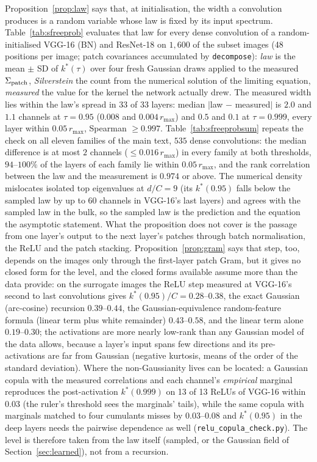\documentclass[10pt,journal,compsoc]{IEEEtran}
\begin{document}
Proposition~\ref{prop:law} says that, at initialisation, the width a convolution produces is a random variable whose law is fixed by its input spectrum. Table~\ref{tab:sfreeprob} evaluates that law for every dense convolution of a random-initialised VGG-16 (BN) and ResNet-18 on $1{,}600$ of the subset images (48 positions per image; patch covariances accumulated by \texttt{decompose}): \emph{law} is the mean $\pm$ SD of $k^*(\tau)$ over four fresh Gaussian draws applied to the measured $\Sigma_{\rm patch}$, \emph{Silverstein} the count from the numerical solution of the limiting equation, \emph{measured} the value for the kernel the network actually drew. The measured width lies within the law's spread in 33 of 33 layers: median $|$law $-$ measured$|$ is $2.0$ and $1.1$ channels at $\tau = 0.95$ ($0.008$ and $0.004\,r_{\max}$) and $0.5$ and $0.1$ at $\tau = 0.999$, every layer within $0.05\,r_{\max}$, Spearman $\ge 0.997$. Table~\ref{tab:sfreeprobsum} repeats the check on all eleven families of the main text, $535$ dense convolutions: the median difference is at most $2$ channels ($\le 0.016\,r_{\max}$) in every family at both thresholds, $94$--$100\%$ of the layers of each family lie within $0.05\,r_{\max}$, and the rank correlation between the law and the measurement is $0.974$ or above. The numerical density mislocates isolated top eigenvalues at $d/C = 9$ (its $k^*(0.95)$ falls below the sampled law by up to $60$ channels in VGG-16's last layers) and agrees with the sampled law in the bulk, so the sampled law is the prediction and the equation the asymptotic statement. What the proposition does not cover is the passage from one layer's output to the next layer's patches through batch normalisation, the ReLU and the patch stacking. Proposition~\ref{prop:gram} says that step, too, depends on the images only through the first-layer patch Gram, but it gives no closed form for the level, and the closed forms available assume more than the data provide: on the surrogate images the ReLU step measured at VGG-16's second to last convolutions gives $k^*(0.95)/C = 0.28$--$0.38$, the exact Gaussian (arc-cosine) recursion $0.39$--$0.44$, the Gaussian-equivalence random-feature formula \cite{pennington2017nonlinear} (linear term plus white remainder) $0.43$--$0.58$, and the linear term alone $0.19$--$0.30$; the activations are more nearly low-rank than any Gaussian model of the data allows, because a layer's input spans few directions and its pre-activations are far from Gaussian (negative kurtosis, means of the order of the standard deviation). Where the non-Gaussianity lives can be located: a Gaussian copula with the measured correlations and each channel's \emph{empirical} marginal reproduces the post-activation $k^*(0.999)$ on 13 of 13 ReLUs of VGG-16 within $0.03$ (the ruler's threshold sees the marginals' tails), while the same copula with marginals matched to four cumulants misses by $0.03$--$0.08$ and $k^*(0.95)$ in the deep layers needs the pairwise dependence as well (\texttt{relu\_copula\_check.py}). The level is therefore taken from the law itself (sampled, or the Gaussian field of Section~\ref{sec:learned}), not from a recursion.
\end{document}

